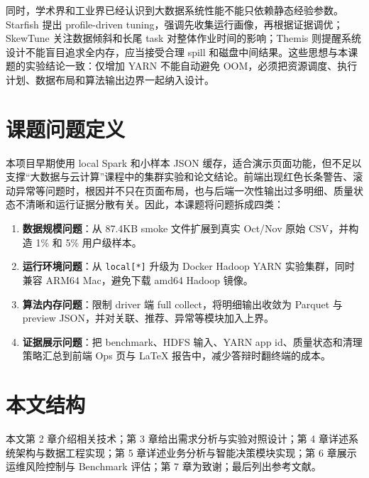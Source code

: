 同时，学术界和工业界已经认识到大数据系统性能不能只依赖静态经验参数。Starfish 提出 profile-driven tuning，强调先收集运行画像，再根据证据调优\cite{herodotou2011starfish}；SkewTune 关注数据倾斜和长尾 task 对整体作业时间的影响\cite{kwon2012skewtune}；Themis 则提醒系统设计不能盲目追求全内存，应当接受合理 spill 和磁盘中间结果\cite{rasmussen2012themis}。这些思想与本课题的实验结论一致：仅增加 YARN 不能自动避免 OOM，必须把资源调度、执行计划、数据布局和算法输出边界一起纳入设计。

\section{课题问题定义}

本项目早期使用 local Spark 和小样本 JSON 缓存，适合演示页面功能，但不足以支撑“大数据与云计算”课程中的集群实验和论文结论。前端出现红色长条警告、滚动异常等问题时，根因并不只在页面布局，也与后端一次性输出过多明细、质量状态不清晰和运行证据分散有关。因此，本课题将问题拆成四类：

\begin{enumerate}
    \item \textbf{数据规模问题}：从 87.4KB smoke 文件扩展到真实 Oct/Nov 原始 CSV，并构造 1\% 和 5\% 用户级样本。
    \item \textbf{运行环境问题}：从 \texttt{local[*]} 升级为 Docker Hadoop YARN 实验集群，同时兼容 ARM64 Mac，避免下载 amd64 Hadoop 镜像。
    \item \textbf{算法内存问题}：限制 driver 端 full collect，将明细输出收敛为 Parquet 与 preview JSON，并对关联、推荐、异常等模块加入上界。
    \item \textbf{证据展示问题}：把 benchmark、HDFS 输入、YARN app id、质量状态和清理策略汇总到前端 Ops 页与 LaTeX 报告中，减少答辩时翻终端的成本。
\end{enumerate}

\section{本文结构}

本文第 2 章介绍相关技术；第 3 章给出需求分析与实验对照设计；第 4 章详述系统架构与数据工程实现；第 5 章详述业务分析与智能决策模块实现；第 6 章展示运维风险控制与 Benchmark 评估；第 7 章为致谢；最后列出参考文献。
